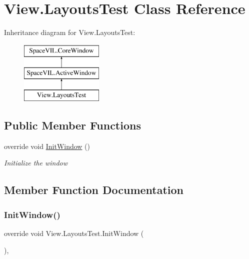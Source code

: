 \hypertarget{class_view_1_1_layouts_test}{}\section{View.\+Layouts\+Test Class Reference}
\label{class_view_1_1_layouts_test}
Inheritance diagram for View.\+Layouts\+Test\+:\begin{figure}[H]
\begin{center}
\leavevmode
\includegraphics[height=3.000000cm]{class_view_1_1_layouts_test}
\end{center}
\end{figure}
\subsection*{Public Member Functions}
\begin{DoxyCompactItemize}
\item 
override void \mbox{\hyperlink{class_view_1_1_layouts_test_a6e89f1beff3ea667915a0987203df404}{Init\+Window}} ()
\begin{DoxyCompactList}\small\item\em Initialize the window \end{DoxyCompactList}\end{DoxyCompactItemize}


\subsection{Member Function Documentation}
\mbox{\label{class_view_1_1_layouts_test_a6e89f1beff3ea667915a0987203df404}} 
\subsubsection{\texorpdfstring{Init\+Window()}{InitWindow()}}
{\footnotesize\ttfamily override void View.\+Layouts\+Test.\+Init\+Window (\begin{DoxyParamCaption}{ }\end{DoxyParamCaption})\hspace{0.3cm}{\ttfamily [inline]}, {\ttfamily [virtual]}}




